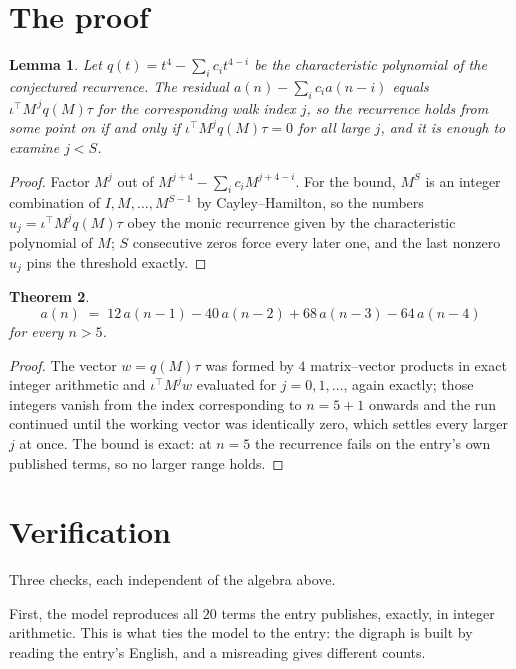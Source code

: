 \documentclass[11pt,a4paper]{article}
\theoremstyle{plain}
\newtheorem{theorem}{Theorem}
\newtheorem{lemma}[theorem]{Lemma}
\theoremstyle{definition}
\begin{document}
\section{The proof}

\begin{lemma}\label{lem:crit}
Let $q(t)=t^{4}-\sum_i c_it^{4-i}$ be the characteristic polynomial of the
conjectured recurrence. The residual $a(n)-\sum_ic_ia(n-i)$ equals
$\iota^{\!\top}M^{\,j}q(M)\tau$ for the corresponding walk index $j$, so the recurrence
holds from some point on if and only if $\iota^{\!\top}M^{j}q(M)\tau=0$ for all large $j$,
and it is enough to examine $j<S$.
\end{lemma}

\begin{proof}
Factor $M^{j}$ out of $M^{j+4}-\sum_ic_iM^{j+4-i}$. For the bound, $M^{S}$
is an integer combination of $I,M,\dots,M^{S-1}$ by Cayley--Hamilton, so the numbers
$u_j=\iota^{\!\top}M^{j}q(M)\tau$ obey the monic recurrence given by the characteristic
polynomial of $M$; $S$ consecutive zeros force every later one, and the last nonzero $u_j$
pins the threshold exactly.
\end{proof}

\begin{theorem}
\[
a(n)\;=\;12\,a(n-1) - 40\,a(n-2) + 68\,a(n-3) - 64\,a(n-4)
\]
for every $n>5$.
\end{theorem}

\begin{proof}
The vector $w=q(M)\tau$ was formed by $4$ matrix--vector products in exact integer
arithmetic and $\iota^{\!\top}M^{j}w$ evaluated for $j=0,1,\dots$, again exactly; those
integers vanish from the index corresponding to $n=5+1$ onwards and the run continued
until the working vector was identically zero, which settles every larger $j$ at once. The bound is exact: at $n=5$ the recurrence fails on the entry's own published terms, so no larger range holds.
\end{proof}

\section{Verification}

Three checks, each independent of the algebra above.

First, the model reproduces all $20$ terms the entry publishes, exactly, in integer
arithmetic. This is what ties the model to the entry: the digraph is built by reading the
entry's English, and a misreading gives different counts.
\end{document}
